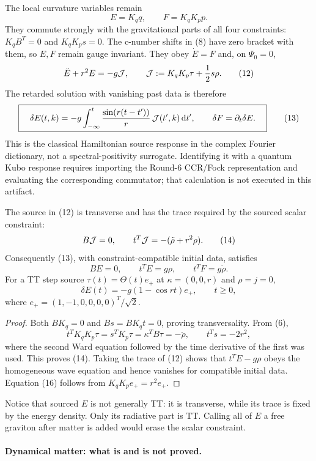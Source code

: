The local curvature variables remain
\[
 E=K_qq,\qquad F=K_qK_pp.                         \tag{11}
\]
They commute strongly with the gravitational parts of all four constraints:
$K_qB^T=0$ and $K_qK_ps=0$.  The c-number shifts in (8) have zero bracket
with them, so $E,F$ remain gauge invariant.  They obey $\dot E=F$ and, on
$\Psi_0=0$,
\[
 \ddot E+r^2E=-g\mathcal J,\qquad
 \mathcal J:=K_qK_p\tau+\frac12s\rho.                  \tag{12}
\]
The retarded solution with vanishing past data is therefore
\[
 \boxed{\quad
 \delta E(t,k)=-g\int_{-\infty}^{t}
 \frac{\sin(r(t-t'))}{r}\,\mathcal J(t',k)\,\mathrm{d} t',
 \qquad \delta F=\partial_t\delta E .\quad}       \tag{13}
\]
This is the classical Hamiltonian source response in the complex Fourier
dictionary, not a spectral-positivity surrogate.  Identifying it with a quantum
Kubo response requires importing the Round-6 CCR/Fock representation and
evaluating the corresponding commutator; that calculation is not executed in
this artifact.

\begin{theorem}
The source in (12) is transverse and has the trace required by the sourced
scalar constraint:
\[
 B\mathcal J=0,\qquad t^T\mathcal J=-(\ddot\rho+r^2\rho).       \tag{14}
\]
Consequently (13), with constraint-compatible initial data, satisfies
\[
 BE=0,\qquad t^TE=g\rho,\qquad t^TF=g\dot\rho.  \tag{15}
\]
For a TT step source $\tau(t)=\Theta(t)e_+$ at
$\kappa=(0,0,r)$ and $\rho=j=0$,
\[
 \delta E(t)=-g(1-\cos rt)e_+,\qquad t\ge0,       \tag{16}
\]
where $e_+=(1,-1,0,0,0,0)^T/\sqrt2$.
\end{theorem}

\begin{proof}
Both $BK_q=0$ and $Bs=BK_qt=0$, proving transversality.  From (6),
\[
 t^TK_qK_p\tau=s^TK_p\tau=\kappa^TB\tau=-\ddot\rho,
 \qquad t^Ts=-2r^2,
\]
where the second Ward equation followed by the time derivative of the first
was used.  This proves (14).  Taking the trace of (12) shows that
$t^TE-g\rho$ obeys the homogeneous wave equation and hence vanishes for
compatible initial data.  Equation (16) follows from $K_qK_pe_+=r^2e_+$.
\end{proof}

Notice that sourced $E$ is not generally TT: it is transverse, while its trace
is fixed by the energy density.  Only its radiative part is TT.  Calling all of
$E$ a free graviton after matter is added would erase the scalar constraint.

\paragraph{Dynamical matter: what is and is not proved.}

